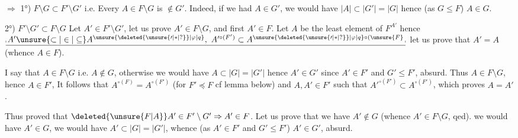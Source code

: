  $\Rightarrow$ 1°) $F\setminus G\subset F'\setminus G'$ i.e. Every $A\in F\setminus G$ is $\notin G'$. Indeed, if we had $A\in G'$, we would have $|A|\subset|G'|=|G|$ hence  (as $G\leq F$) $A\in G$.


2°) $F'\setminus G'\subset F\setminus G$ Let $A'\in F'\setminus G'$, let us prove $A'\in F\setminus G$, and first $A'\in F$.  Let $A$ be the least element of $F^{A'}$ hence $\underline{\rule[-.15ex]{.35pt}{.55ex}\,A'\unsure{\subset|\in|\subseteq} A^{\unsure{\deleted{\unsure{\prime|\ast|?}}|\varphi|q}},\ A'^{\circ(F')}\subset A^{\unsure{\deleted{\unsure{\prime|\ast|?}}|\varphi|q}\circ(\unsure{F}}\,\rule[-.15ex]{.35pt}{.55ex}}$ let us prove that $A'=A$ (whence $A\in F$). 

I say that $A\in F\setminus G$ i.e. $A\notin G$, otherwise we would have $A\subset|G|=|G'|$ hence $A'\in G'$ since $A'\in F'$ and $G'\leq F'$, absurd.  Thus $A\in F\setminus G$, hence $A\in F'$,  It follows that $A^{\circ(F)}=A^{\circ(F')}$ (for $F'\preceq F$\deleted{)} cf lemma below) and   $A,A'\in F'$ such that $A'^{\circ(F')}\subset A^{\circ(F')}$, which proves $A=A'$.

Thus  proved that $\deleted{\unsure{F|A}}A'\in F'\setminus G'\Rightarrow A'\in F$. Let us prove that we have $A'\notin G$ (whence $A'\in F\setminus G$\deleted{)}, qed).  we would have $A'\in G$, we would have $A'\subset |G|=|G'|$, whence (as $A'\in F'$ and $G'\leq F'$) $A'\in G'$, absurd.


